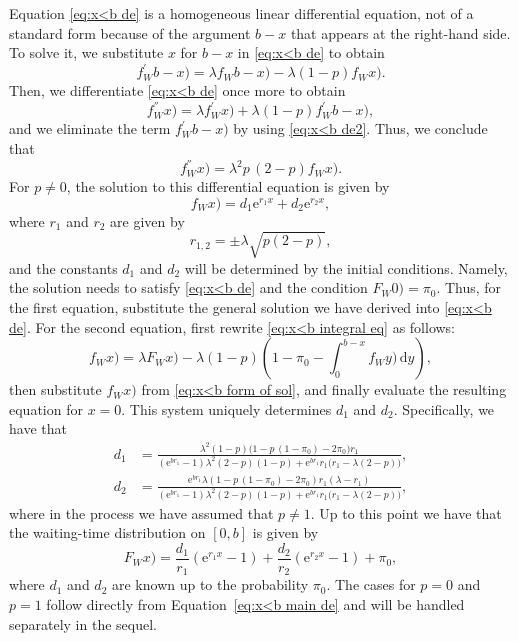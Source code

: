 \documentclass[reqno, 11pt, a4paper]{article}
\theoremstyle{plain}
\theoremstyle{remark}
\numberwithin{equation}{section}
\begin{document}
Equation \eqref{eq:x<b de} is a homogeneous linear differential equation, not of a standard form because of the argument $b-x$ that appears at the right-hand side. To solve it, we substitute $x$ for $b-x$ in \eqref{eq:x<b de} to obtain
\begin{equation}\label{eq:x<b de2}
{\mbox{$f_W^{'}$}}b-x)=\lambda {\mbox{$f_W^{}$}}b-x)-\lambda(1-p){\mbox{$f_W^{}$}}x).
\end{equation}
Then, we differentiate \eqref{eq:x<b de} once more to obtain
$$
{\mbox{$f_W^{''}$}}x)=\lambda {\mbox{$f_W^{'}$}}x)+\lambda(1-p){\mbox{$f_W^{'}$}}b-x),
$$
and we eliminate the term ${\mbox{$f_W^{'}$}}b-x)$ by using \eqref{eq:x<b de2}. Thus, we conclude that
\begin{equation}\label{eq:x<b main de}
{\mbox{$f_W^{''}$}}x)=\lambda^2 p\,(2-p) {\mbox{$f_W^{}$}}x).
\end{equation}
For $p\neq 0$, the solution to this differential equation is given by
\begin{equation}\label{eq:x<b form of sol}
{\mbox{$f_W^{}$}}x)=d_1 \mathrm{e}^{r_1 x}+d_2 \mathrm{e}^{r_2 x},
\end{equation}
where $r_1$ and $r_2$ are given by
\begin{equation}\label{eq:r12}
r_{1,2}=\pm \lambda \sqrt{p(2-p)},
\end{equation}
and the constants $d_1$ and $d_2$ will be determined by the initial conditions. Namely, the solution needs to satisfy \eqref{eq:x<b de} and the condition ${\mbox{$F_W^{}$}}0)=\pi_0$. Thus, for the first equation, substitute the general solution we have derived into \eqref{eq:x<b de}. For the second equation, first rewrite \eqref{eq:x<b integral eq} as follows:
$$
{\mbox{$f_W^{}$}}x)=\lambda {\mbox{$F_W^{}$}}x)-\lambda (1-p) \left(1-\pi_0-\int_0^{b-x}{\mbox{$f_W^{}$}}y)\,\mathrm{d}y\right),
$$
then substitute ${\mbox{$f_W^{}$}}x)$ from \eqref{eq:x<b form of sol}, and finally evaluate the resulting equation for $x=0$. This system uniquely determines $d_1$ and $d_2$. Specifically, we have that
\begin{align*}
d_1&=\frac{\lambda^2 (1-p) \bigl(1-p\, (1-\pi_0)-2 \pi_0\bigr) r_1}{(\mathrm{e}^{b r_1}-1) \lambda^2 (2-p) (1-p)+\mathrm{e}^{b r_1} r_1 \bigl(r_1-\lambda (2-p)\bigr)},\\
d_2&=\frac{\mathrm{e}^{b r_1} \lambda (1-p\, (1-\pi_0)-2 \pi_0) r_1 \left(\lambda-r_1\right)}{(\mathrm{e}^{b r_1}-1) \lambda^2 (2-p) (1-p)+\mathrm{e}^{b r_1} r_1 \bigl(r_1-\lambda (2-p)\bigr)},
\end{align*}
where in the process we have assumed that $p\neq 1$. Up to this point we have that the waiting-time distribution on $[0,b]$ is given by
\begin{equation}\label{eq:distr x<b}
{\mbox{$F_W^{}$}}x)=\frac{d_1}{r_1}(\mathrm{e}^{r_1 x}-1)+\frac{d_2}{r_2}(\mathrm{e}^{r_2 x}-1)+\pi_0,
\end{equation}
where $d_1$ and $d_2$ are known up to the probability $\pi_0$. The cases for $p=0$ and $p=1$ follow directly from Equation~\eqref{eq:x<b main de} and will be handled separately in the sequel.\\
\end{document}
